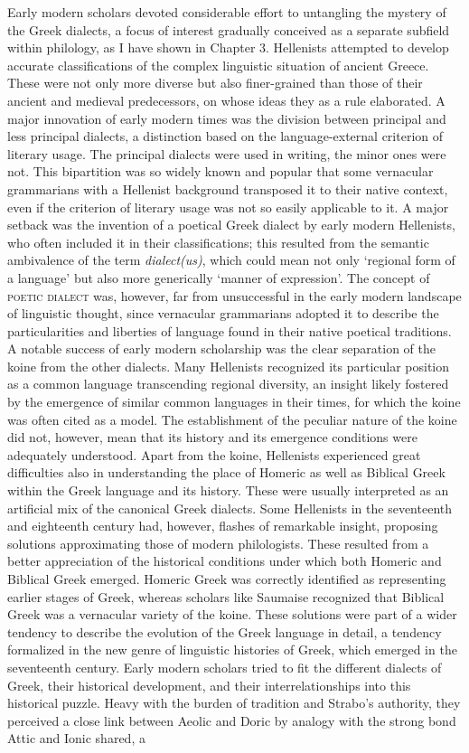 \documentclass[output=paper]{langsci/langscibook}
\begin{document}
Early modern scholars devoted considerable effort to untangling the mystery of the Greek dialects, a focus of interest gradually conceived as a separate subfield within philology, as I have shown in Chapter 3. Hellenists attempted to develop accurate classifications of the complex linguistic situation of ancient Greece. These were not only more diverse but also finer-grained than those of their ancient and medieval predecessors, on whose ideas they as a rule elaborated. A major innovation of early modern times was the division between principal and less principal dialects, a distinction based on the language-external criterion of literary usage. The principal dialects were used in writing, the minor ones were not. This bipartition was so widely known and popular that some vernacular grammarians with a Hellenist background transposed it to their native context, even if the criterion of literary usage was not so easily applicable to it. A major setback was the invention of a poetical Greek dialect by early modern Hellenists, who often included it in their classifications; this resulted from the semantic ambivalence of the term \textit{dialect(us)}, which could mean not only ‘regional form of a language’ but also more generically ‘manner of expression’. The concept of \textsc{poetic} \textsc{dialect} was, however, far from unsuccessful in the early modern landscape of linguistic thought, since vernacular grammarians adopted it to describe the particularities and liberties of language found in their native poetical traditions. A notable success of early modern scholarship was the clear separation of the koine from the other dialects. Many Hellenists recognized its particular position as a common language transcending regional diversity, an insight likely fostered by the emergence of similar common languages in their times, for which the koine was often cited as a model. The establishment of the peculiar nature of the koine did not, however, mean that its history and its emergence conditions were adequately understood. Apart from the koine, Hellenists experienced great difficulties also in understanding the place of Homeric as well as Biblical Greek within the Greek language and its history. These were usually interpreted as an artificial mix of the canonical Greek dialects. Some Hellenists in the seventeenth and eighteenth century had, however, flashes of remarkable insight, proposing solutions approximating those of modern philologists. These resulted from a better appreciation of the historical conditions under which both Homeric and Biblical Greek emerged. Homeric Greek was correctly identified as representing earlier stages of Greek, whereas scholars like Saumaise recognized that Biblical Greek was a vernacular variety of the koine. These solutions were part of a wider tendency to describe the evolution of the Greek language in detail, a tendency formalized in the new genre of linguistic histories of Greek, which emerged in the seventeenth century. Early modern scholars tried to fit the different dialects of Greek, their historical development, and their interrelationships into this historical puzzle. Heavy with the burden of tradition and Strabo’s authority, they perceived a close link between Aeolic and Doric by analogy with the strong bond Attic and Ionic shared, a 
\end{document}
